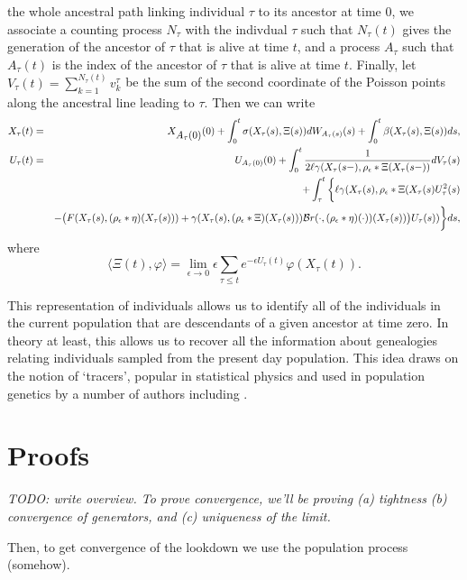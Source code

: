 \documentclass[12pt]{article}
\newcommand{\comment}[1]{{\color{blue} \it #1}}
\begin{document}
the whole ancestral path linking individual $\tau$ to its ancestor at 
time $0$, we associate a counting process $N_{\tau}$ with the indivdual
$\tau$    
such that $N_{\tau}(t)$ gives the generation of the ancestor of $\tau$ 
that is alive at time $t$,
and a process $A_{\tau}$ such that 
$A_{\tau}(t)$ is 
the index of the ancestor of $\tau$ that is alive at time $t$. 
Finally, let $V_{\tau}(t)=\sum_{k=1}^{N_{\tau}(t)}v_k^{\tau}$ be the sum of the second 
coordinate of the Poisson points along the ancestral line 
leading to $\tau$.  Then we can write 
\begin{eqnarray*}
X_{\tau}(t)&=&X_{\mbox{\rm $A_{\tau}(0)$}}(0)+\int_0^t\sigma 
(X_{\tau}(s),\Xi (s))dW_{A_{\tau}(s)}(s)+\int_0^t\beta (X_{\tau}
(s),\Xi (s))ds,\\
U_{\tau}(t)&=&U_{A_{\tau}(0)}(0)+\int_0^t\frac 1{2\ell \gamma(X_{\tau}(s-),\rho_\epsilon*\Xi(X_{\tau}(s-))}dV_{\tau}(s)\\
&&\qquad\qquad +\int_{\tau}^t\bigg\{\ell \gamma(X_{\tau}(s),\rho_\epsilon*\Xi(X_{\tau}(s)U_{\tau}^2(s) \\
&&-\big(F(X_{\tau}(s), (\rho_{\epsilon}*\eta)(X_{\tau}(s)))+\gamma(X_{\tau}(s), (\rho_{\epsilon}*\Xi)(X_{\tau}(s)))\mathcal{B}r(\cdot,(\rho_{\epsilon}*\eta)(\cdot))(X_{\tau}(s))\big)U_{\tau}(s))\bigg\}ds,\end{eqnarray*}
where
\[\langle\Xi (t),\varphi\rangle =\lim_{\epsilon\rightarrow 0}
\epsilon\sum_{
\tau\leq t}e^{-\epsilon U_{\tau}(t)}\varphi (X_{\tau}(t)).\]

This representation of individuals allows us to identify all 
of the individuals in the current population that are descendants of a
given ancestor at time zero. In theory at least, this allows us to
recover all the information about genealogies relating individuals 
sampled from the present day population. This idea draws on the notion
of `tracers', popular in statistical physics and used in population
genetics by a number of authors including 
\cite{biswas/etheridge/klimek:2018, durrett/fan:2016, hallatschek/nelson:2008}.





\section{Proofs}

\comment{
    TODO: write overview.
    To prove convergence, we'll be proving
    (a) tightness
    (b) convergence of generators, and
    (c) uniqueness of the limit.

    Then, to get convergence of the lookdown
    we use the population process (somehow).
}
\end{document}
